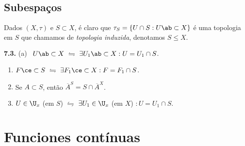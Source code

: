 \ejemplo{\centering \(+\) Exemplos importantes (em \(X = \R\))
\tcblower
\centering \(\B = \{(a, \infty) : a \in \R\}\) \hspace{0.5cm} \(\mid \) \hspace{0.5cm} \(\B :=\{[a,b): a <b\}\) (top. Sorgenfrey) 
}

\subsection*{Subespaços}

\begin{definition}
    Dados \((X,\tau )\) e \(S\subset X\), é claro que \(\tau_S = \{U \cap S : U\ab \subset X\}\) é uma topologia em \(S\) que chamamos de \emph{topologia induzida}, denotamos \(S\leq X\). 
\end{definition}

\begin{proposition}
    \textbf{7.3.} (a) \ \(U\ab\subset X \ \leftrightharpoons \ \exists U_1\ab \subset X : U = U_1 \cap S\). 
    \vspace{-0.2cm}
    \begin{enumerate}[label = (\alph*), left = 0.6cm]
        \item[(b)] \(F\ce \subset S \ \leftrightharpoons \ \exists F_1\ce \subset X : F = F_1 \cap S\). 
        \item[(c)] Se \(A \subset S\), então \(\overline{A}^S = S \cap \overline{A}^X\). 
        \item[(d)] \(U \in \U_x\) (em \(S\)) \(\leftrightharpoons\) \(\exists U_1 \in \U_x\) (em \(X\)) \( : U = U_1 \cap S\). 
    \end{enumerate}
\end{proposition}

\section{Funciones contínuas}